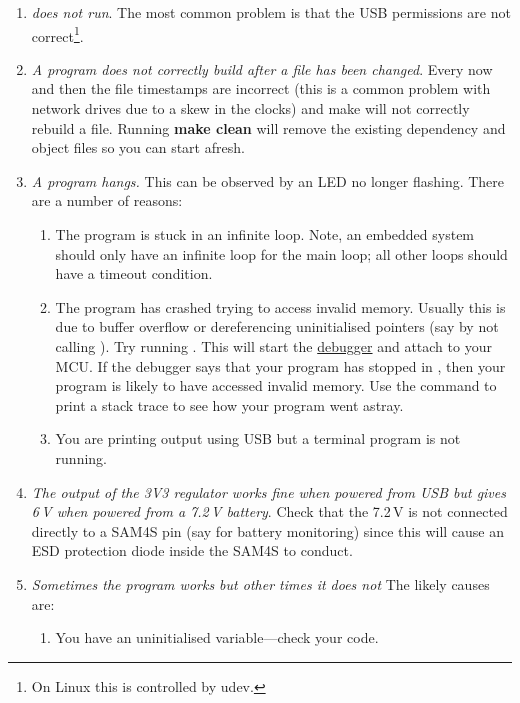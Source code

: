 \begin{enumerate}
\item
  \emph{ does not run}. The most common problem is
  that the USB permissions are not correct\footnote{On Linux this is
    controlled by udev.}.

\item
  \emph{A program does not correctly build after a file has been
    changed}. Every now and then the file timestamps are incorrect
  (this is a common problem with network drives due to a skew in the
  clocks) and make will not correctly rebuild a file. Running
  \textbf{make clean} will remove the existing dependency and object
  files so you can start afresh.

\item
  \emph{A program hangs.} This can be observed by an LED no longer
  flashing. There are a number of reasons:

  \begin{enumerate}
  \item
    The program is stuck in an infinite loop. Note, an embedded system
    should only have an infinite loop for the main loop; all other loops
    should have a timeout condition.
  \item
    The program has crashed trying to access invalid memory. Usually
    this is due to buffer overflow or dereferencing uninitialised
    pointers (say by not calling ). Try running
    .  This will start the
    \protect\hyperref[debugging]{debugger} and attach to your MCU. If
    the debugger says that your program has stopped in
    , then your program is likely to have
    accessed invalid memory. Use the  command to print a
    stack trace to see how your program went astray.

  \item You are printing output using USB but a terminal program is
    not running.
  \end{enumerate}

\item
  \emph{The output of the 3V3 regulator works fine when powered from
    USB but gives 6\,V when powered from a 7.2\,V battery}. Check that
  the 7.2\,V is not connected directly to a SAM4S pin (say for battery
  monitoring) since this will cause an ESD protection diode inside the
  SAM4S to conduct.

\item \emph{Sometimes the program works but other times it does not}
  The likely causes are:
  \begin{enumerate}
  \item You have an uninitialised variable---check your code.


\end{enumerate}
\end{enumerate}
